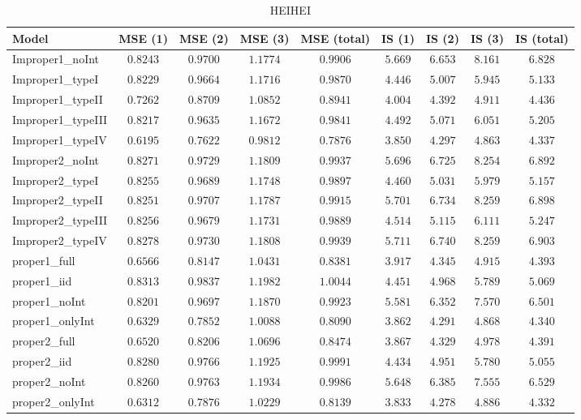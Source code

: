 \begin{table}

\caption{\label{tab:model-choice-sc2}HEIHEI}
\centering
\begin{tabular}{lcccccccc}
\hline
Model  & MSE (1) & MSE (2) & MSE (3) & MSE (total) & IS (1) & IS (2) & IS (3) & \multicolumn{1}{c}{IS (total)} \\ 
\hline
Improper1_noInt  & $0.8243$ & $0.9700$ & $1.1774$ & $0.9906$ & $5.669$ & $6.653$ & $8.161$ & $6.828$ \\
Improper1_typeI  & $0.8229$ & $0.9664$ & $1.1716$ & $0.9870$ & $4.446$ & $5.007$ & $5.945$ & $5.133$ \\
Improper1_typeII  & $0.7262$ & $0.8709$ & $1.0852$ & $0.8941$ & $4.004$ & $4.392$ & $4.911$ & $4.436$ \\
Improper1_typeIII  & $0.8217$ & $0.9635$ & $1.1672$ & $0.9841$ & $4.492$ & $5.071$ & $6.051$ & $5.205$ \\
Improper1_typeIV  & $0.6195$ & $0.7622$ & $0.9812$ & $0.7876$ & $3.850$ & $4.297$ & $4.863$ & $4.337$ \\
Improper2_noInt  & $0.8271$ & $0.9729$ & $1.1809$ & $0.9937$ & $5.696$ & $6.725$ & $8.254$ & $6.892$ \\
Improper2_typeI  & $0.8255$ & $0.9689$ & $1.1748$ & $0.9897$ & $4.460$ & $5.031$ & $5.979$ & $5.157$ \\
Improper2_typeII  & $0.8251$ & $0.9707$ & $1.1787$ & $0.9915$ & $5.701$ & $6.734$ & $8.259$ & $6.898$ \\
Improper2_typeIII  & $0.8256$ & $0.9679$ & $1.1731$ & $0.9889$ & $4.514$ & $5.115$ & $6.111$ & $5.247$ \\
Improper2_typeIV  & $0.8278$ & $0.9730$ & $1.1808$ & $0.9939$ & $5.711$ & $6.740$ & $8.259$ & $6.903$ \\
proper1_full  & $0.6566$ & $0.8147$ & $1.0431$ & $0.8381$ & $3.917$ & $4.345$ & $4.915$ & $4.393$ \\
proper1_iid  & $0.8313$ & $0.9837$ & $1.1982$ & $1.0044$ & $4.451$ & $4.968$ & $5.789$ & $5.069$ \\
proper1_noInt  & $0.8201$ & $0.9697$ & $1.1870$ & $0.9923$ & $5.581$ & $6.352$ & $7.570$ & $6.501$ \\
proper1_onlyInt  & $0.6329$ & $0.7852$ & $1.0088$ & $0.8090$ & $3.862$ & $4.291$ & $4.868$ & $4.340$ \\
proper2_full  & $0.6520$ & $0.8206$ & $1.0696$ & $0.8474$ & $3.867$ & $4.329$ & $4.978$ & $4.391$ \\
proper2_iid  & $0.8280$ & $0.9766$ & $1.1925$ & $0.9991$ & $4.434$ & $4.951$ & $5.780$ & $5.055$ \\
proper2_noInt  & $0.8260$ & $0.9763$ & $1.1934$ & $0.9986$ & $5.648$ & $6.385$ & $7.555$ & $6.529$ \\
proper2_onlyInt  & $0.6312$ & $0.7876$ & $1.0229$ & $0.8139$ & $3.833$ & $4.278$ & $4.886$ & $4.332$ \\
\hline 
\end{tabular}

\end{table}